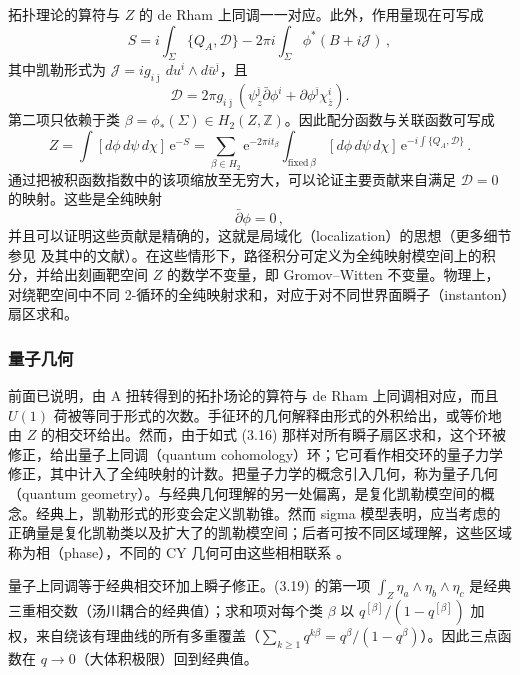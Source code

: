 拓扑理论的算符与 $Z$ 的 de Rham 上同调一一对应。此外，作用量现在可写成
\begin{equation}\tag{3.14}
S=i\int_{\Sigma}\{Q_A,\mathcal{D}\}-2\pi i\int_{\Sigma}\phi^{*}(B+i\mathcal{J})\,,
\end{equation}
其中凯勒形式为 $\mathcal{J}=ig_{i\bar\jmath}\,du^{i}\wedge d\bar u^{\bar\jmath}$，且
\begin{equation}\tag{3.15}
\mathcal{D}=2\pi g_{i\bar\jmath}\left(\psi^{\bar\jmath}_{z}\bar\partial\phi^{i}+\partial\phi^{\bar\jmath}\chi^{i}_{\bar z}\right).
\end{equation}
第二项只依赖于类 $\beta=\phi_{*}(\Sigma)\in H_2(Z,\mathbb{Z})$。因此配分函数与关联函数可写成
\begin{equation}\tag{3.16}
Z=\int[d\phi\,d\psi\,d\chi]\,\mathrm{e}^{-S}
=\sum_{\beta\in H_2}\mathrm{e}^{-2\pi i t_{\beta}}
\int_{\mathrm{fixed}\,\beta}[d\phi\,d\psi\,d\chi]\,
\mathrm{e}^{-i\int\{Q_A,\mathcal{D}\}}\,.
\end{equation}
通过把被积函数指数中的该项缩放至无穷大，可以论证主要贡献来自满足 $\mathcal{D}=0$ 的映射。这些是全纯映射
\[
\bar\partial\phi=0\,,
\]
并且可以证明这些贡献是精确的，这就是局域化（localization）的思想（更多细节参见 \cite{ref9,ref10} 及其中的文献）。在这些情形下，路径积分可定义为全纯映射模空间上的积分，并给出刻画靶空间 $Z$ 的数学不变量，即 Gromov--Witten 不变量。物理上，对绕靶空间中不同 2-循环的全纯映射求和，对应于对不同世界面瞬子（instanton）扇区求和。

\subsubsection{量子几何}
\label{sec:3.4.2}

前面已说明，由 A 扭转得到的拓扑场论的算符与 de Rham 上同调相对应，而且 $U(1)$ 荷被等同于形式的次数。手征环的几何解释由形式的外积给出，或等价地由 $Z$ 的相交环给出。然而，由于如式 (3.16) 那样对所有瞬子扇区求和，这个环被修正，给出量子上同调（quantum cohomology）环；它可看作相交环的量子力学修正，其中计入了全纯映射的计数。把量子力学的概念引入几何，称为量子几何（quantum geometry）。与经典几何理解的另一处偏离，是复化凯勒模空间的概念。经典上，凯勒形式的形变会定义凯勒锥。然而 sigma 模型表明，应当考虑的正确量是复化凯勒类以及扩大了的凯勒模空间；后者可按不同区域理解，这些区域称为相（phase），不同的 CY 几何可由这些相相联系 \cite{ref42,ref43,ref44}。

\begin{yizhu}[物理图像]
量子上同调等于经典相交环加上瞬子修正。(3.19) 的第一项 $\int_Z\eta_a\wedge\eta_b\wedge\eta_c$ 是经典三重相交数（汤川耦合的经典值）；求和项对每个类 $\beta$ 以 $q^{[\beta]}/(1-q^{[\beta]})$ 加权，来自绕该有理曲线的所有多重覆盖（$\sum_{k\ge1}q^{k\beta}=q^{\beta}/(1-q^{\beta})$）。因此三点函数在 $q\to0$（大体积极限）回到经典值。
\end{yizhu}

